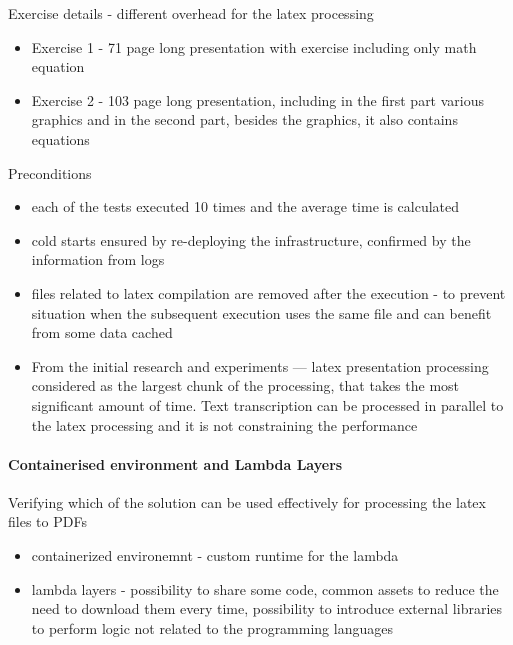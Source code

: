 Exercise details - different overhead for the latex processing

\begin{itemize}
    \item Exercise 1 - 71 page long presentation with exercise including only math equation
    \item Exercise 2 - 103 page long presentation, including in the first part various graphics and in the second part, besides the graphics, it also contains equations
\end{itemize}


Preconditions

\begin{itemize}
    \item each of the tests executed 10 times and the average time is calculated
    \item cold starts ensured by re-deploying the infrastructure, confirmed by the information from logs
    \item files related to latex compilation are removed after the execution - to prevent situation when the subsequent execution uses the same file and can benefit from some data cached
    \item From the initial research and experiments --- latex presentation processing considered as the largest chunk of the processing, that takes the most significant amount of time. Text transcription can be processed in parallel to the latex processing and it is not constraining the performance
\end{itemize}

\paragraph{Containerised environment and Lambda Layers}

Verifying which of the solution can be used effectively for processing the latex files to PDFs

\begin{itemize}
    \item containerized environemnt - custom runtime for the lambda
    \item lambda layers - possibility to share some code, common assets to reduce the need to download them every time, possibility to introduce external libraries to perform logic not related to the programming languages
\end{itemize}

